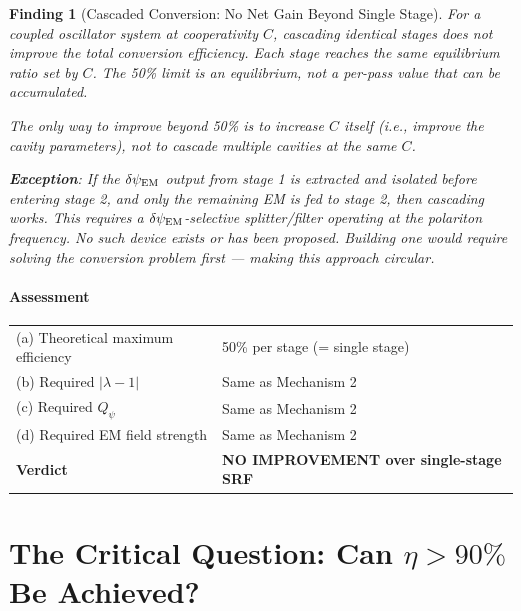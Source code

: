 \documentclass[11pt]{article}
\newtheorem{finding}{Finding}
\newcommand{\dpsiEM}{\delta\psi_{\rm EM}}
\newcommand{\lambdaone}{|\lambda{-}1|}
\newcommand{\Qpsi}{Q_\psi}
\begin{document}
\begin{finding}[Cascaded Conversion: No Net Gain Beyond Single Stage]
\label{find:cascade-fail}
For a coupled oscillator system at cooperativity $C$, cascading
identical stages does \emph{not} improve the total conversion
efficiency. Each stage reaches the same equilibrium ratio set by
$C$. The 50\% limit is an equilibrium, not a per-pass value that
can be accumulated.

The only way to improve beyond 50\% is to increase $C$ itself (i.e.,
improve the cavity parameters), not to cascade multiple cavities at
the same $C$.

\textbf{Exception}: If the $\dpsiEM$ output from stage 1 is
\emph{extracted and isolated} before entering stage 2, and only the
remaining EM is fed to stage 2, then cascading works. This requires a
$\dpsiEM$-selective splitter/filter operating at the polariton frequency.
No such device exists or has been proposed. Building one would require
solving the conversion problem first --- making this approach circular.
\end{finding}

\subsection{Assessment}

\begin{center}
\begin{tabular}{ll}
\toprule
(a) Theoretical maximum efficiency & 50\% per stage (= single stage) \\
(b) Required $\lambdaone$ & Same as Mechanism 2 \\
(c) Required $\Qpsi$ & Same as Mechanism 2 \\
(d) Required EM field strength & Same as Mechanism 2 \\
\midrule
\textbf{Verdict} & \textbf{NO IMPROVEMENT over single-stage SRF} \\
\bottomrule
\end{tabular}
\end{center}

\part{The Critical Question: Can $\eta > 90\%$ Be Achieved?}
\label{part:90-percent}
\end{document}
